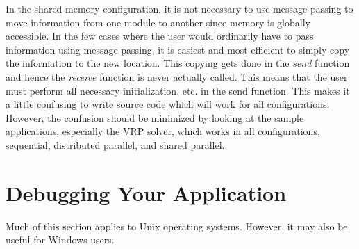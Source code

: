 In the shared memory configuration, it is not necessary to use
message passing to move information from one module to another since
memory is globally accessible. In the few cases where the user would
ordinarily have to pass information using message passing, it is
easiest and most efficient to simply copy the information to the new
location. This copying gets done in the {\em send} function and hence
the {\em receive} function is never actually called. This means that
the user must perform all necessary initialization, etc. in the send
function. This makes it a little confusing to write source code which
will work for all configurations. However, the confusion should be
minimized by looking at the sample applications, especially the VRP solver,
which works in all configurations, sequential, distributed parallel, and
shared parallel. 





\section{Debugging Your Application}

Much of this section applies to Unix operating systems. However, it may
also be useful for Windows users.

